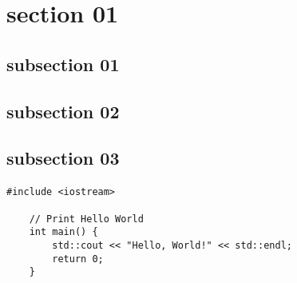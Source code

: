 \documentclass[class=book, crop=false]{standalone}
\begin{document}
\section{section 01}
\subsection{subsection 01}

\paragraph*{}
\blindmathpaper

\cite{knuth:1984}

\subsection{subsection 02}

\paragraph*{}
\blindtext

\subsection{subsection 03}

\paragraph*{}
\blindtext

\begin{lstlisting}[style=cpp, caption={Sample C++ Code}, label=lst:cppsample]
    #include <iostream>
    
    // Print Hello World
    int main() {
        std::cout << "Hello, World!" << std::endl;
        return 0;
    }
\end{lstlisting}
\end{document}

